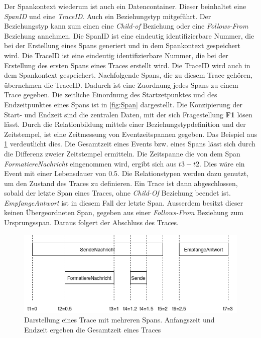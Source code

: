 Der Spankontext wiederum ist auch ein Datencontainer. Dieser beinhaltet eine \emph{SpanID} und eine \emph{TraceID}. Auch ein Beziehungstyp mitgeführt. Der Beziehungstyp kann zum einen eine \emph{Child-of} Beziehung oder eine \emph{Follows-From} Beziehung annehmen. Die SpanID ist eine eindeutig identifizierbare Nummer, die bei der Erstellung eines Spans generiert und in dem Spankontext gespeichert wird. Die TraceID ist eine eindeutig identifizierbare Nummer, die bei der Erstellung des ersten Spans eines Traces erstellt wird. Die TraceID wird auch in dem Spankontext gespeichert. Nachfolgende Spans, die zu diesem Trace gehören, übernehmen die TraceID. Dadurch ist eine Zuordnung jedes Spans zu einem Trace gegeben. Die zeitliche Einordnung des Startzetpunktes und des Endzeitpunktes eines Spans ist in  \cref{fig:Span} dargestellt. Die Konzipierung der Start- und Endzeit sind die zentralen Daten, mit der sich Fragestellung \textbf{F1} lösen lässt. Durch die Relationbildung mittels einer Beziehungstypdefinition und der Zeitstempel, ist eine Zeitmessung von Eventzeitspannen gegeben. Das Beispiel aus \cref{fig:Eventzeitspannen} verdeutlicht dies. Die Gesamtzeit eines Events bzw. eines Spans lässt sich durch die Differenz zweier Zeitstempel ermitteln. Die Zeitspanne die von dem Span \emph{FormatiereNachricht} eingenommen wird, ergibt sich aus $t3 - t2$. Dies wäre ein Event mit einer Lebensdauer von 0.5. Die Relationstypen werden dazu genutzt, um den Zustand des Traces zu definieren. Ein Trace ist dann abgeschlossen, sobald der letzte Span eines Traces, ohne \emph{Child-Of} Beziehung beendet ist. \emph{EmpfangeAntwort} ist in diesem Fall der letzte Span. Ausserdem besitzt dieser keinen Übergeordneten Span, gegeben aus einer \emph{Follows-From} Beziehung zum Ursprungsspan. Daraus folgert der Abschluss des Traces.

\begin{figure}[!b]
	\centering
	\includegraphics[scale=0.7]{img/Design/Eventzeitspannen.png}
	\caption[Zeitmessung von Spans eines Traces]{Darstellung eines Trace mit mehreren Spans. Anfangszeit und Endzeit ergeben die Gesamtzeit eines Traces}
	\label{fig:Eventzeitspannen}
\end{figure}



